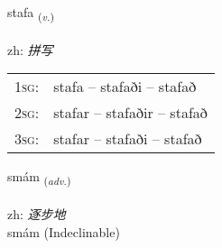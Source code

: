 \documentclass[frontgrid, backgrid]{flacards}\usepackage[]{graphicx}\usepackage[]{color}
\begin{document}
\renewcommand{\flhead}{\vskip5pt \fboxsep=0pt {\small\bfseries\footnotesize Sagnorð | 动词}}
\renewcommand{\fcfoot}{\vskip5pt \fboxsep=0pt \hspace{2pt}{\small\bfseries\footnotesize 2K}}

\renewcommand{\blhead}{\vskip5pt {\small\bfseries\footnotesize Sagnorð | 动词 }}
\renewcommand{\bcfoot}{\vskip5pt \hspace{2pt}{\small\bfseries\footnotesize 2K}}


{stafa \small{\textsubscript{(\textit{v.})}} \\[1ex] %
\textphonetic{[staːva]} \\
zh: \emph{拼写} \\  [2ex]
\renewcommand*{\arraystretch}{0.8}
\begin{tabular}{p{1cm}l}
\textsc{1sg}: & stafa -- stafaði -- stafað \\ 
\textsc{2sg}: & stafar -- stafaðir -- stafað \\ 
\textsc{3sg}: & stafar -- stafaði -- stafað \\ 
\end{tabular}
}


\renewcommand{\flhead}{\vskip5pt \fboxsep=0pt {\small\bfseries\footnotesize Atviksorð | 副词}}
\renewcommand{\fcfoot}{\vskip5pt \fboxsep=0pt \hspace{2pt}{\small\bfseries\footnotesize 2K}}

\renewcommand{\blhead}{\vskip5pt {\small\bfseries\footnotesize Atviksorð | 副词 }}
\renewcommand{\bcfoot}{\vskip5pt \hspace{2pt}{\small\bfseries\footnotesize 2K}}


{smám \small{\textsubscript{(\textit{adv.})}} \\[1ex]
\textphonetic{[smauːm]} \\
zh: \emph{逐步地} \\  [2ex]
smám (Indeclinable)}

\renewcommand{\flhead}{\vskip5pt \fboxsep=0pt {\small\bfseries\footnotesize Lýsingarorð | 形容词}}
\renewcommand{\fcfoot}{\vskip5pt \fboxsep=0pt \hspace{2pt}{\small\bfseries\footnotesize 2K}}
\end{document}
